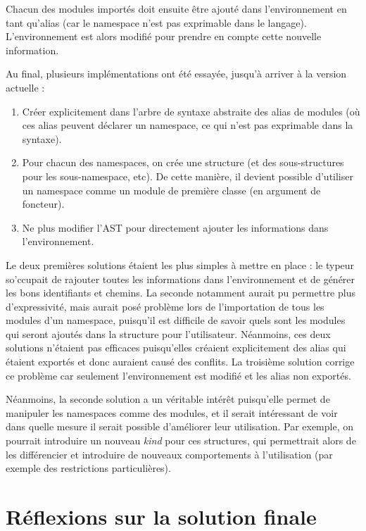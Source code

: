 \documentclass[11pt,a4paper]{report}
\begin{document}
Chacun des modules importés doit ensuite être ajouté dans l'environnement en
tant qu'alias (car le namespace n'est pas exprimable dans le
langage). L'environnement est alors modifié pour prendre en compte cette
nouvelle information.

Au final, plusieurs implémentations ont été essayée, jusqu'à arriver à la
version actuelle :
\begin{enumerate}
\item Créer explicitement dans l'arbre de syntaxe abstraite des alias de modules
  (où ces alias peuvent déclarer un namespace, ce qui n'est pas exprimable dans
  la syntaxe).
\item Pour chacun des namespaces, on crée une structure (et des sous-structures
  pour les sous-namespace, etc). De cette manière, il devient possible
  d'utiliser un namespace comme un module de première classe (en argument de
  foncteur).
\item Ne plus modifier l'AST pour directement ajouter les informations dans
  l'environnement.
\end{enumerate}
Le deux premières solutions étaient les plus simples à mettre en place : le
typeur so'ccupait de rajouter toutes les informations dans l'environnement et de
générer les bons identifiants et chemins. La seconde notamment aurait pu
permettre plus d'expressivité, mais aurait posé problème lors de l'importation
de tous les modules d'un namespace, puisqu'il est difficile de savoir quels sont
les modules qui seront ajoutés dans la structure pour
l'utilisateur. Néanmoins, ces deux solutions n'étaient pas efficaces
puisqu'elles créaient explicitement des alias qui étaient exportés et donc
auraient causé des conflits. La troisième solution corrige ce problème car
seulement l'environnement est modifié et les alias non exportés.

Néanmoins, la seconde solution a un véritable intérêt puisqu'elle permet de
manipuler les namespaces comme des modules, et il serait intéressant de voir
dans quelle mesure il serait possible d'améliorer leur utilisation. Par exemple,
on pourrait introduire un nouveau \emph{kind} pour ces structures, qui
permettrait alors de les différencier et introduire de nouveaux comportements à
l'utilisation (par exemple des restrictions particulières). 

\section{Réflexions sur la solution finale}
\end{document}
